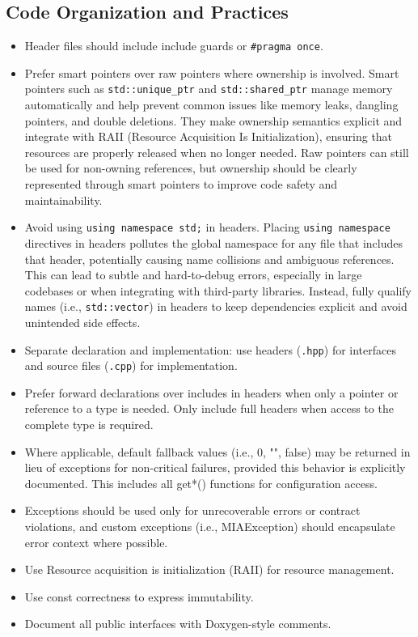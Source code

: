 \subsection{Code Organization and Practices}
\begin{itemize}\itemsep0em
    \item Header files should include include guards or \texttt{\#pragma once}.
    \item Prefer smart pointers over raw pointers where ownership is involved. Smart pointers such as \texttt{std::unique\_ptr} and \texttt{std::shared\_ptr} manage memory automatically and help prevent common issues like memory leaks, dangling pointers, and double deletions. They make ownership semantics explicit and integrate with RAII (Resource Acquisition Is Initialization), ensuring that resources are properly released when no longer needed. Raw pointers can still be used for non-owning references, but ownership should be clearly represented through smart pointers to improve code safety and maintainability.    
    \item Avoid using \texttt{using namespace std;} in headers. Placing \texttt{using namespace} directives in headers pollutes the global namespace for any file that includes that header, potentially causing name collisions and ambiguous references. This can lead to subtle and hard-to-debug errors, especially in large codebases or when integrating with third-party libraries. Instead, fully qualify names (i.e., \texttt{std::vector}) in headers to keep dependencies explicit and avoid unintended side effects.
    \item Separate declaration and implementation: use headers (\texttt{.hpp}) for interfaces and source files (\texttt{.cpp}) for implementation.
    \item Prefer forward declarations over includes in headers when only a pointer or reference to a type is needed. Only include full headers when access to the complete type is required.
    \item Where applicable, default fallback values (i.e., 0, "", false) may be returned in lieu of exceptions for non-critical failures, provided this behavior is explicitly documented. This includes all get*() functions for configuration access.
    \item Exceptions should be used only for unrecoverable errors or contract violations, and custom exceptions (i.e., MIAException) should encapsulate error context where possible.
    \item Use Resource acquisition is initialization (RAII) for resource management.
    \item Use const correctness to express immutability.
    \item Document all public interfaces with Doxygen-style comments.
\end{itemize}



